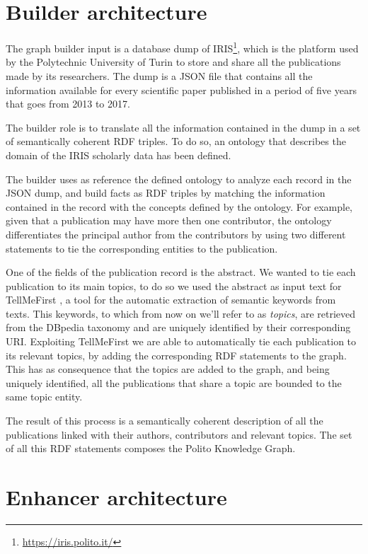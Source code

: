 \documentclass[%
    corpo=13.5pt,
    twoside,
    oldstyle,
    tipotesi=magistrale,
    greek,
    evenboxes
]{toptesi}
\begin{document}
\section{Builder architecture}

The graph builder input is a database dump of
IRIS\footnote{\url{https://iris.polito.it/}}, which is the platform
used by the Polytechnic University of Turin to store and share all the
publications made by its researchers. The dump is a JSON file that contains
all the information available for every scientific paper published in a period
of five years that goes from 2013 to 2017.

The builder role is to translate all the information contained in the dump in a
set of semantically coherent RDF triples. To do so, an ontology that
describes the domain of the IRIS scholarly data has been defined.

The builder uses as reference the defined ontology to analyze each record in
the JSON dump, and build facts as RDF triples by matching the information
contained in the record with the concepts defined by the ontology.
For example, given that a publication may have more then one contributor, the
ontology differentiates the principal author from the contributors by using two
different statements to tie the corresponding entities to the publication.

One of the fields of the publication record is the abstract. We wanted to
tie each publication to its main topics, to do so we used the abstract
as input text for TellMeFirst \cite{rocha2015}, a tool for the automatic
extraction of semantic keywords from texts. This keywords, to which from now
on we'll refer to as \emph{topics}, are retrieved from the DBpedia taxonomy
and are uniquely identified by their corresponding URI.
Exploiting TellMeFirst we are able to automatically tie each publication to
its relevant topics, by adding the corresponding RDF statements to the graph.
This has as consequence that the topics are added to the graph, and being
uniquely identified, all the publications that share a topic are
bounded to the same topic entity.

The result of this process is a semantically coherent description of all the
publications linked with their authors, contributors and relevant topics.
The set of all this RDF statements composes the Polito Knowledge Graph.


\section{Enhancer architecture}
\end{document}
